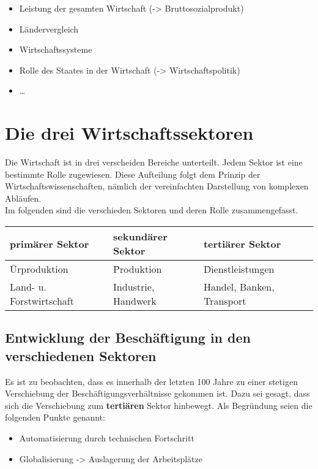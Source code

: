 \documentclass[a4paper,11pt]{scrartcl}	%
\begin{document}
		\begin{itemize}
			\item Leistung der gesamten Wirtschaft (-> Bruttosozialprodukt)
			\item Ländervergleich
			\item Wirtschaftssysteme
			\item Rolle des Staates in der Wirtschaft (-> Wirtschaftspolitik)
			\item \dots
		\end{itemize}
	
\section{Die drei Wirtschaftssektoren}

Die Wirtschaft ist in drei verscheiden Bereiche unterteilt. Jedem Sektor ist eine bestimmte Rolle zugewiesen.
Diese Aufteilung folgt dem Prinzip der Wirtschaftswissenschaften, nämlich der vereinfachten Darstellung von 
komplexen Abläufen.\\[0.5cm]
Im folgenden sind die verschieden Sektoren und deren Rolle zusammengefasst. \\

	\begin{tabular}{|l|l|l|}
	\hline
		\textbf{primärer Sektor}	&	\textbf{sekundärer Sektor}	&	\textbf{tertiärer Sektor} \\ \hline
		\= Urproduktion			&	\= Produktion				&	\= Dienstleistungen \\ \hline
		Land- u. Forstwirtschaft	& 	Industrie, Handwerk			&	Handel, Banken, Transport \\ \hline
	\end{tabular}

	\subsection{Entwicklung der Beschäftigung in den verschiedenen Sektoren}
	
	Es ist zu beobachten, dass es innerhalb der letzten 100 Jahre zu einer stetigen Verschiebung der Beschäftigungsverhältnisse gekommen ist.
	Dazu sei gesagt, dass sich die Verschiebung zum \textbf{tertiären} Sektor hinbewegt. Als Begründung seien die
	folgenden Punkte genannt:
		
		\begin{itemize}
			\item Automatisierung durch technischen Fortschritt
			\item Globalisierung -> Auslagerung der Arbeitsplätze			
		\end{itemize}		 

	
	
\end{document}
